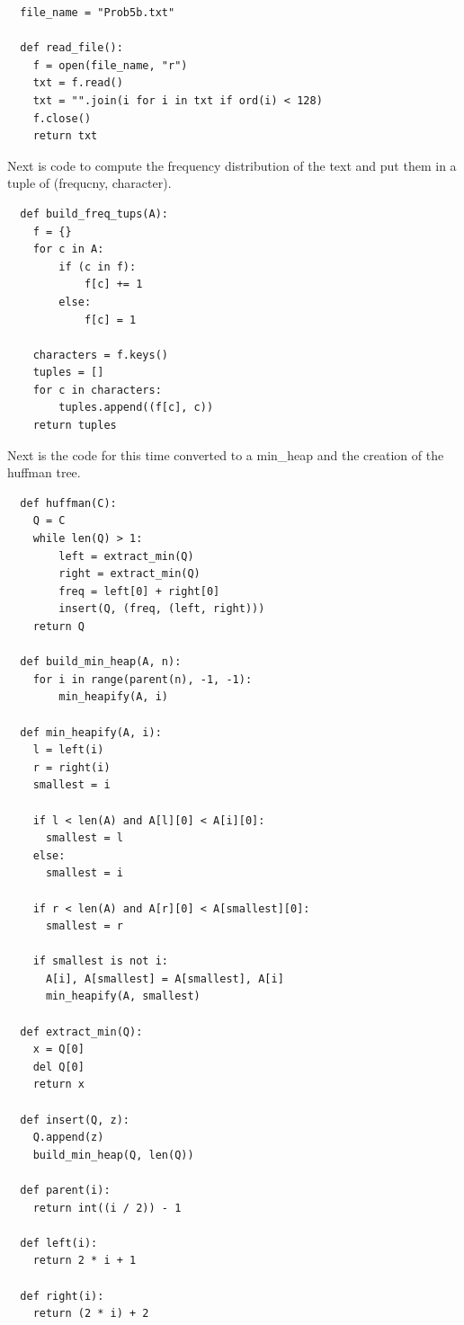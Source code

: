 \documentclass{article}
\begin{document}
\begin{enumerate}
\begin{enumerate}
\begin{lstlisting}
  file_name = "Prob5b.txt"

  def read_file():
    f = open(file_name, "r")
    txt = f.read()
    txt = "".join(i for i in txt if ord(i) < 128)
    f.close()
    return txt
        \end{lstlisting}

        Next is code to compute the frequency distribution of the text and put them in a tuple of (frequcny, character).
        
        \begin{lstlisting}
  def build_freq_tups(A):
    f = {} 
    for c in A: 
        if (c in f): 
            f[c] += 1
        else: 
            f[c] = 1
            
    characters = f.keys()
    tuples = []
    for c in characters:
        tuples.append((f[c], c))    
    return tuples
        \end{lstlisting}
        
        Next is the code for this time converted to a min\_heap and the creation of the huffman tree.
        
        \begin{lstlisting}
  def huffman(C):
    Q = C
    while len(Q) > 1:
        left = extract_min(Q)
        right = extract_min(Q)
        freq = left[0] + right[0]
        insert(Q, (freq, (left, right)))
    return Q

  def build_min_heap(A, n):
    for i in range(parent(n), -1, -1): 
        min_heapify(A, i) 

  def min_heapify(A, i):    
    l = left(i)
    r = right(i)
    smallest = i

    if l < len(A) and A[l][0] < A[i][0]:
      smallest = l
    else:
      smallest = i
        
    if r < len(A) and A[r][0] < A[smallest][0]:
      smallest = r

    if smallest is not i:
      A[i], A[smallest] = A[smallest], A[i]        
      min_heapify(A, smallest)
        
  def extract_min(Q):
    x = Q[0]
    del Q[0]
    return x

  def insert(Q, z):
    Q.append(z)
    build_min_heap(Q, len(Q))

  def parent(i):
    return int((i / 2)) - 1
          
  def left(i):
    return 2 * i + 1

  def right(i):
    return (2 * i) + 2          
        \end{lstlisting}


\end{enumerate}
\end{enumerate}
\end{document}
